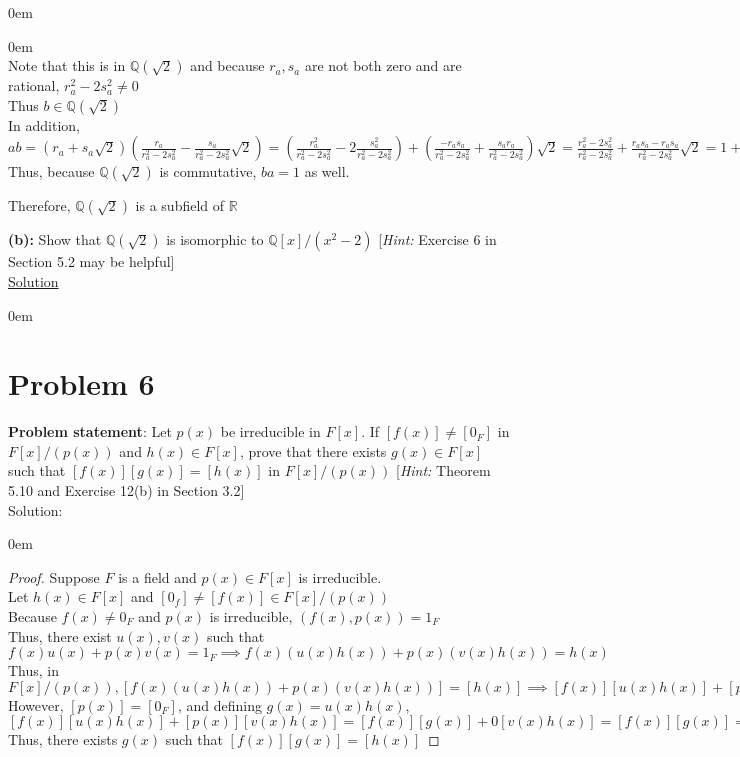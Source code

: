 \documentclass{article} %
\begin{document}
\begin{addmargin}[1em]{0em}
\begin{addmargin}[1em]{0em}
\\Note that this is in $\mathbb{Q}(\sqrt{2})$ and because $r_a, s_a$ are not both zero and are rational, $r_a^2 - 2s_a^2 \neq 0$
\\Thus $b \in \mathbb{Q}(\sqrt{2})$
\\In addition, $ab = (r_a + s_a\sqrt{2})(\frac{r_a}{r_a^2-2s_a^2} - \frac{s_a}{r_a^2-2s_a^2}\sqrt{2}) = (\frac{r_a^2}{r_a^2-2s_a^2} - 2\frac{s_a^2}{r_a^2 - 2s_a^2}) + (\frac{-r_as_a}{r_a^2-2s_a^2} + \frac{s_ar_a}{r_a^2-2s_a^2})\sqrt{2} = \frac{r_a^2 - 2s_a^2}{r_a^2- 2s_a^2} + \frac{r_as_a - r_as_a}{r_a^2 - 2s_a^2}\sqrt{2} = 1 + 0\sqrt{2} = 1$
\\Thus, because $\mathbb{Q}(\sqrt{2})$ is commutative, $ba = 1$ as well.
\end{addmargin}
Therefore, $\mathbb{Q}(\sqrt{2})$ is a subfield of $\mathbb{R}$
\end{addmargin}

\textbf{(b):} Show that $\mathbb{Q}(\sqrt{2})$ is isomorphic to $\mathbb{Q}[x]/(x^2-2)$ [\textit{Hint: }Exercise 6 in Section 5.2 may be helpful]
\\

\underline{Solution}
\begin{addmargin}[1em]{0em}
\end{addmargin}

\newpage

\section*{Problem 6}


\textbf{Problem statement}: Let $p(x)$ be irreducible in $F[x]$.  If $[f(x)] \neq [0_F]$ in $F[x]/(p(x))$ and $h(x) \in F[x]$, prove that there exists $g(x) \in F[x]$ such that $[f(x)][g(x)] = [h(x)]$ in $F[x]/(p(x))$ [\textit{Hint: } Theorem 5.10 and Exercise 12(b) in Section 3.2]
\\

Solution: 
\begin{addmargin}[1em]{0em}
\begin{proof}
Suppose $F$ is a field and $p(x) \in F[x]$ is irreducible.
\\Let $h(x) \in F[x]$ and $[0_f] \neq [f(x)] \in F[x]/(p(x))$
\\Because $f(x) \neq 0_F$ and $p(x)$ is irreducible, $(f(x), p(x)) = 1_F$
\\Thus, there exist $u(x), v(x)$ such that $f(x)u(x) + p(x)v(x) = 1_F \implies f(x)(u(x)h(x)) + p(x)(v(x)h(x)) = h(x)$
\\Thus, in $F[x]/(p(x)), [f(x)(u(x)h(x)) + p(x)(v(x)h(x))] = [h(x)] \implies [f(x)][u(x)h(x)] + [p(x)][v(x)h(x)] = [h(x)]$
\\However, $[p(x)] = [0_F]$, and defining $g(x) = u(x)h(x)$, $[f(x)][u(x)h(x)] + [p(x)][v(x)h(x)] = [f(x)][g(x)] + 0[v(x)h(x)] = [f(x)][g(x)] = [h(x)]$
\\Thus, there exists $g(x)$ such that $[f(x)][g(x)] = [h(x)]$
\end{proof}
\end{addmargin}
\end{document}
